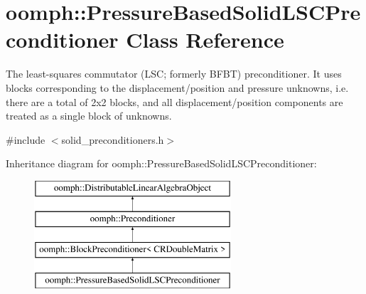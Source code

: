 \hypertarget{classoomph_1_1PressureBasedSolidLSCPreconditioner}{}\section{oomph\+:\+:Pressure\+Based\+Solid\+L\+S\+C\+Preconditioner Class Reference}
\label{classoomph_1_1PressureBasedSolidLSCPreconditioner}


The least-\/squares commutator (L\+SC; formerly B\+F\+BT) preconditioner. It uses blocks corresponding to the displacement/position and pressure unknowns, i.\+e. there are a total of 2x2 blocks, and all displacement/position components are treated as a single block of unknowns.  




{\ttfamily \#include $<$solid\+\_\+preconditioners.\+h$>$}

Inheritance diagram for oomph\+:\+:Pressure\+Based\+Solid\+L\+S\+C\+Preconditioner\+:\begin{figure}[H]
\begin{center}
\leavevmode
\includegraphics[height=4.000000cm]{classoomph_1_1PressureBasedSolidLSCPreconditioner}
\end{center}
\end{figure}
